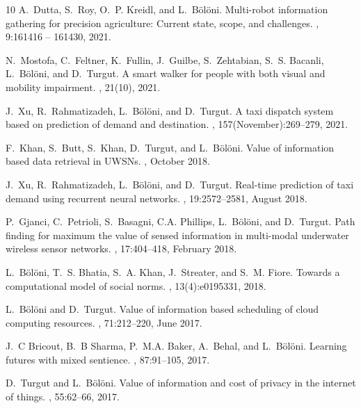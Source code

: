\begin{thebibliography}{10}
A.~Dutta, S.~Roy, O.~P. Kreidl, and L.~Bölöni.
\newblock Multi-robot information gathering for precision agriculture: Current
  state, scope, and challenges.
, 9:161416 -- 161430, 2021.

N.~Mostofa, C.~Feltner, K.~Fullin, J.~Guilbe, S.~Zehtabian, S.~S. Bacanli,
  L.~Bölöni, and D.~Turgut.
\newblock A smart walker for people with both visual and mobility impairment.
, 21(10), 2021.

J.~Xu, R.~Rahmatizadeh, L.~Bölöni, and D.~Turgut.
\newblock A taxi dispatch system based on prediction of demand and destination.
,
  157(November):269--279, 2021.

F.~Khan, S.~Butt, S.~Khan, D.~Turgut, and L.~Bölöni.
\newblock Value of information based data retrieval in {UWSN}s.
, October 2018.

J.~Xu, R.~Rahmatizadeh, L.~Bölöni, and D.~Turgut.
\newblock Real-time prediction of taxi demand using recurrent neural networks.
,
  19:2572--2581, August 2018.

P.~Gjanci, C.~Petrioli, S.~Basagni, C.A. Phillips, L.~Bölöni, and D.~Turgut.
\newblock Path finding for maximum the value of sensed information in
  multi-modal underwater wireless sensor networks.
, 17:404--418, February
  2018.

L.~Bölöni, T.~S. Bhatia, S.~A. Khan, J.~Streater, and S.~M. Fiore.
\newblock Towards a computational model of social norms.
, 13(4):e0195331, 2018.

L.~Bölöni and D.~Turgut.
\newblock Value of information based scheduling of cloud computing resources.
, 71:212--220, June 2017.

J.~C Bricout, B.~B Sharma, P.~M.A. Baker, A.~Behal, and L.~Bölöni.
\newblock Learning futures with mixed sentience.
, 87:91--105, 2017.

D.~Turgut and L.~Bölöni.
\newblock Value of information and cost of privacy in the internet of things.
, 55:62--66, 2017.


\end{thebibliography}

